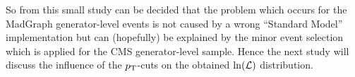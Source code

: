 So from this small study can be decided that the problem which occurs for the MadGraph generator-level events is not caused by a wrong ``Standard Model'' implementation but can (hopefully) be explained by the minor event selection which is applied for the CMS generator-level sample.
Hence the next study will discuss the influence of the $p_{\textrm T}$-cuts  on the obtained $\ln(\mathcal{L})$ distribution.